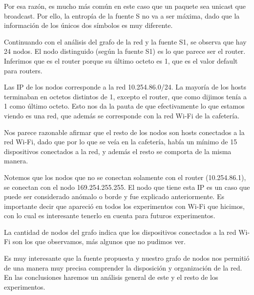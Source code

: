 Por esa razón, es mucho más común en este caso que un paquete sea unicast que broadcast. Por ello, la entropía de la fuente S no va a ser máxima, dado que la información de los únicos dos símbolos es muy diferente.

Continuando con el análisis del grafo de la red y la fuente S1, se observa que hay 24 nodos. El nodo distinguido (según la fuente S1) es lo que parece ser el router. Inferimos que es el router porque su último octeto es 1, que es el valor default para routers. 

Las IP de los nodos corresponde a la red 10.254.86.0/24. La mayoría de los hosts terminaban en octetos distintos de 1, excepto el router, que como dijimos tenía a 1 como último octeto. Esto nos da la pauta de que efectivamente lo que estamos viendo es una red, que además se corresponde con la red Wi-Fi de la cafetería.

Nos parece razonable afirmar que el resto de los nodos son hosts conectados a la red Wi-Fi, dado que por lo que se veía en la cafetería, había un mínimo de 15 dispositivos conectados a la red, y además el resto se comporta de la misma manera. 

Notemos que los nodos que no se conectan solamente con el router (10.254.86.1), se conectan con el nodo 169.254.255.255. El nodo que tiene esta IP es un caso que puede ser considerado anómalo o borde y fue explicado anteriormente. Es importante decir que apareció en todos los experimentos con Wi-Fi que hicimos, con lo cual es interesante tenerlo en cuenta para futuros experimentos.

La cantidad de nodos del grafo indica que los dispositivos conectados a la red Wi-Fi son los que observamos, más algunos que no pudimos ver.

Es muy interesante que la fuente propuesta y nuestro grafo de nodos nos permitió de una manera muy precisa comprender la disposición y organización de la red. En las conclusiones haremos un análisis general de este y el resto de los experimentos.






